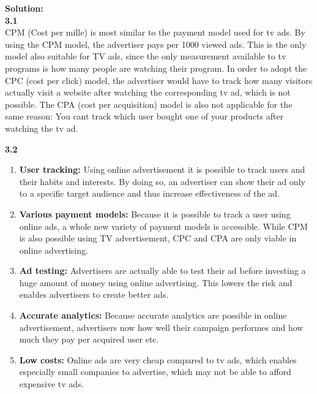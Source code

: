 \documentclass{WeSTassignment}
\begin{document}
\textbf{Solution:}\\
\textbf{3.1}\\
CPM (Cost per mille) is most similar to the payment model used for tv ads. By using the CPM model, the advertiser pays per 1000 viewed ads. This is the only model also suitable for TV ads, since the only measurement available to tv programs is how many people are watching their program. In order to adopt the CPC (cost per click) model, the advertiser would have to track how many visitors actually visit a website after watching the corresponding tv ad, which is not possible. The CPA (cost per acquisition) model is also not applicable for the same reason: You cant track which user bought one of your products after watching the tv ad. 


\textbf{3.2}\\
\begin{enumerate}
	\item \textbf{User tracking:} Using online advertisement it is possible to track users and their habits and interests. By doing so, an advertiser can show their ad only to a specific target audience and thus increase effectiveness of the ad. 
	\item \textbf{Various payment models:} Because it is possible to track a user using online ads, a whole new variety of payment models is accessible. While CPM is also possible using TV advertisement, CPC and CPA are only viable in online advertising.
	\item \textbf{Ad testing:} Advertisers are actually able to test their ad before investing a huge amount of money using online advertising. This lowers the risk and enables advertisers to create better ads. 
	\item \textbf{Accurate analytics:} Because accurate analytics are possible in online advertisement, advertisers now how well their campaign performes and how much they pay per acquired user etc. 
	\item \textbf{Low costs:} Online ads are very cheap compared to tv ads, which enables especially small companies to advertise, which may not be able to afford expensive tv ads.
\end{enumerate}







\makefooter
\end{document}
